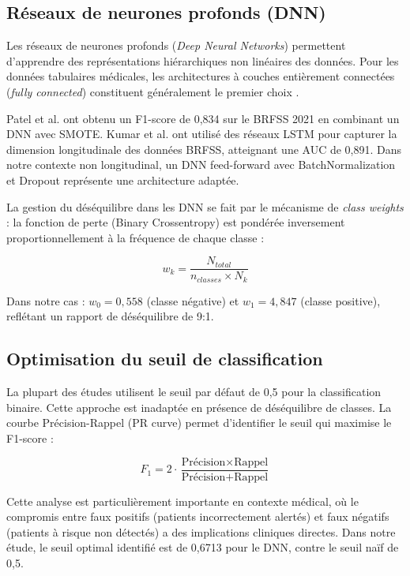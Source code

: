 \subsection{Réseaux de neurones profonds (DNN)}

Les réseaux de neurones profonds (\textit{Deep Neural Networks}) permettent d'apprendre des représentations hiérarchiques non linéaires des données. Pour les données tabulaires médicales, les architectures à couches entièrement connectées (\textit{fully connected}) constituent généralement le premier choix \cite{shwartz2022}.

Patel et al. \cite{patel2023} ont obtenu un F1-score de 0,834 sur le BRFSS 2021 en combinant un DNN avec SMOTE. Kumar et al. \cite{kumar2023} ont utilisé des réseaux LSTM pour capturer la dimension longitudinale des données BRFSS, atteignant une AUC de 0,891. Dans notre contexte non longitudinal, un DNN feed-forward avec BatchNormalization et Dropout représente une architecture adaptée.

La gestion du déséquilibre dans les DNN se fait par le mécanisme de \textit{class weights} : la fonction de perte (Binary Crossentropy) est pondérée inversement proportionnellement à la fréquence de chaque classe :

$$w_k = \frac{N_{total}}{n_{classes} \times N_k}$$

Dans notre cas : $w_0 = 0,558$ (classe négative) et $w_1 = 4,847$ (classe positive), reflétant un rapport de déséquilibre de 9:1.

\subsection{Optimisation du seuil de classification}

La plupart des études utilisent le seuil par défaut de 0,5 pour la classification binaire. Cette approche est inadaptée en présence de déséquilibre de classes. La courbe Précision-Rappel (PR curve) permet d'identifier le seuil qui maximise le F1-score \cite{davis2006} :

$$F_1 = 2 \cdot \frac{\text{Précision} \times \text{Rappel}}{\text{Précision} + \text{Rappel}}$$

Cette analyse est particulièrement importante en contexte médical, où le compromis entre faux positifs (patients incorrectement alertés) et faux négatifs (patients à risque non détectés) a des implications cliniques directes. Dans notre étude, le seuil optimal identifié est de 0,6713 pour le DNN, contre le seuil naïf de 0,5.

